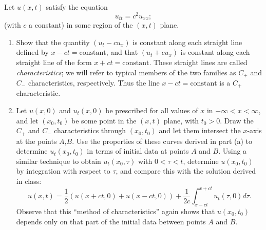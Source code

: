 {%
\begin{Exercise}
  Let $u(x,t)$ satisfy the equation 
  \[
  u_{tt} = c^2 u_{xx};    
  \]
  (with $c$ a constant) in some region of the $(x,t)$ plane.
  \begin{enumerate}
  \item 
    Show that the 
    quantity $(u_t - c u_x)$ is constant along each straight line defined
    by $x-ct = \mathrm{constant}$, and that $(u_t + cu_x)$ is constant along
    each straight line of the form $x+ct = \mathrm{constant}$. These
    straight lines 
    are called \textit{characteristics}; we will refer to typical members
    of the two families as $C_+$ and $C_-$ characteristics, respectively. Thus
    the line $x-ct = \mathrm{constant}$ is a $C_+$ characteristic.
  \item 
    Let $u(x,0)$ and $u_t(x,0)$ be prescribed for all values of
    $x$ in $-\infty < x < \infty$, and let  $(x_0,t_0)$ be some point
    in the $(x,t)$ plane, with $t_0 >0$. Draw the $C_+$ and $C_-$
    characteristics 
    through $(x_0,t_0)$ and let them intersect the $x$-axis at the points
    $A$,$B$. Use the properties of these curves derived in part (a) to
    determine 
    $u_t(x_0,t_0)$ in terms of initial data at points $A$ and $B$. Using 
    a similar technique to obtain $u_t(x_0,\tau)$ with $ 0 < \tau <t$, 
    determine 
    $u(x_0,t_0)$ by integration with respect to $\tau$, and compare this
    with the solution derived in class:
    \[
    u(x,t) = \frac{1}{2} \left( u(x+ct,0) + u(x-ct,0)\right) + 
    \frac{1}{2c} \int_{x-ct}^{x+ct} u_t(\tau,0) d\tau .
    \]
    Observe that this ``method of characteristics'' again shows that $u(x_0,t_0)$
    depends only on that part of the initial data between points $A$ and $B$.
  \end{enumerate}
\end{Exercise}






}
